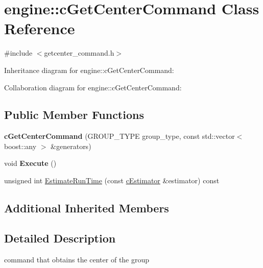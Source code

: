 \hypertarget{classengine_1_1cGetCenterCommand}{\section{engine\-:\-:c\-Get\-Center\-Command Class Reference}
\label{classengine_1_1cGetCenterCommand}
}


{\ttfamily \#include $<$getcenter\-\_\-command.\-h$>$}



Inheritance diagram for engine\-:\-:c\-Get\-Center\-Command\-:


Collaboration diagram for engine\-:\-:c\-Get\-Center\-Command\-:
\subsection*{Public Member Functions}
\begin{DoxyCompactItemize}
\item 
\hypertarget{classengine_1_1cGetCenterCommand_a374048afcb1188128de1d3c69392daa5}{{\bfseries c\-Get\-Center\-Command} (G\-R\-O\-U\-P\-\_\-\-T\-Y\-P\-E group\-\_\-type, const std\-::vector$<$ boost\-::any $>$ \&generators)}\label{classengine_1_1cGetCenterCommand_a374048afcb1188128de1d3c69392daa5}

\item 
\hypertarget{classengine_1_1cGetCenterCommand_a7d2754e5ade6a96e6043547a7f2b1a03}{void {\bfseries Execute} ()}\label{classengine_1_1cGetCenterCommand_a7d2754e5ade6a96e6043547a7f2b1a03}

\item 
unsigned int \hyperlink{classengine_1_1cGetCenterCommand_ab00fa221228c2550e8f664c6d887e1e0}{Estimate\-Run\-Time} (const \hyperlink{classengine_1_1cEstimator}{c\-Estimator} \&estimator) const 
\end{DoxyCompactItemize}
\subsection*{Additional Inherited Members}


\subsection{Detailed Description}
command that obtains the center of the group 

